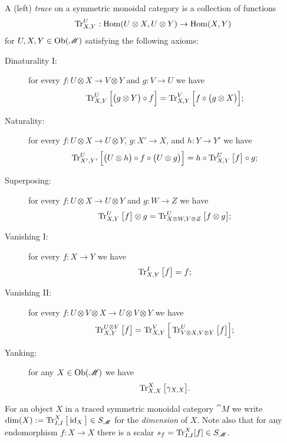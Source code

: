 A (left) \emph{trace} on a symmetric monoidal category is a collection of functions 
\[\operatorname{Tr}^U_{X,Y}:\operatorname{Hom}(U\otimes X,U\otimes Y)\to\operatorname{Hom}(X,Y)\]
for $U,X,Y\in\operatorname{Ob}(\mathscr{M})$ satisfying the following axioms:
\begin{description}
 \item [Dinaturality I:] for every $f:U\otimes X\to V\otimes Y$ and $g:V\to U$ we have
 \[\operatorname{Tr}^U_{X,Y}\Big[\big(g\otimes Y\big)\circ f\Big]=\operatorname{Tr}^V_{X,Y}\Big[f\circ\big(g\otimes X\big)\Big];\] 
 \item [Naturality:] for every $f:U\otimes X\to U\otimes Y$, $g:X'\to X$, and $h:Y\to Y'$ we have
 \[\operatorname{Tr}^U_{X',Y'}\Big[\big(U\otimes h\big)\circ f\circ\big(U\otimes g\big)\Big]=h\circ\operatorname{Tr}^U_{X,Y}\big[f\big]\circ g;\]
 \item [Superposing:] for every $f:U\otimes X\to U\otimes Y$ and $g:W\to Z$ we have
 \[\operatorname{Tr}^U_{X,Y}\big[f\big]\otimes g=\operatorname{Tr}^U_{X\otimes W,Y\otimes Z}\big[f\otimes g\big];\]
 \item [Vanishing I:] for every $f:X\to Y$ we have
 \[\operatorname{Tr}^{I}_{X,Y}\big[f\big]=f;\]
 \item [Vanishing II:] for every $f:U\otimes V\otimes X\to U\otimes V\otimes Y$ we have
 \[\operatorname{Tr}^{U\otimes V}_{X,Y}\big[f\big]=\operatorname{Tr}^V_{X,Y}\Big[\operatorname{Tr}^U_{V\otimes X,V\otimes Y}\big[f\big]\Big];\]
 \item [Yanking:] for any $X\in\operatorname{Ob}(\mathscr{M})$ we have
 \[\operatorname{Tr}^X_{X,X}\big[\gamma_{X,X}\big].\]
\end{description}

For an object $X$ in a traced symmetric monoidal category $\cat{M}$ we write $\dim(X):=\operatorname{Tr}^X_{I,I}\big[\operatorname{id}_X\big]\in S_{\mathscr{M}}$ for the {\em dimension} of $X$.  Note also that for any endomorphism $f:X\to X$ there is a scalar $s_f=\operatorname{Tr}^X_{I,I}[f]\in S_{\mathscr{M}}$.

